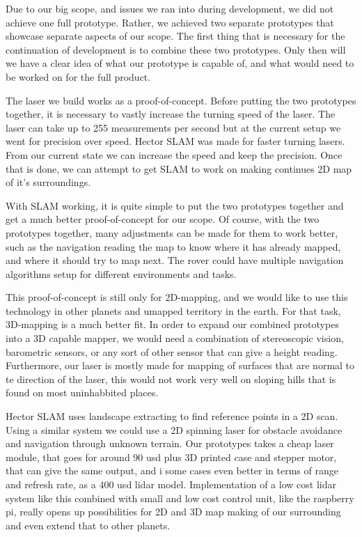 Due to our big scope, and issues we ran into during development, we did not achieve one full prototype. Rather, we achieved two separate prototypes that showcase separate aspects of our scope. The first thing that is necessary for the continuation of development is to combine these two prototypes. Only then will we have a clear idea of what our prototype is capable of, and what would need to be worked on for the full product.

The laser we build works as a proof-of-concept. Before putting the two prototypes together, it is necessary to vastly increase the turning speed of the laser. The laser can take up to 255 measurements per second but at the current setup we went for precision over speed. Hector SLAM was made for faster turning lasers. From our current state we can increase the speed and keep the precision. Once that is done, we can attempt to get SLAM to work on making continues 2D map of it's surroundings.

With SLAM working, it is quite simple to put the two prototypes together and get a much better proof-of-concept for our scope. Of course, with the two prototypes together, many adjustments can be made for them to work better, such as the navigation reading the map to know where it has already mapped, and where it should try to map next. The rover could have multiple navigation algorithms setup for different environments and tasks. 

This proof-of-concept is still only for 2D-mapping, and we would like to use this technology in other planets and umapped territory in the earth. For that task, 3D-mapping is a much better fit. In order to expand our combined prototypes into a 3D capable mapper, we would need a combination of stereoscopic vision, barometric sensors, or any sort of other sensor that can give a height reading. Furthermore, our laser is mostly made for mapping of surfaces that are normal to te direction of the laser, this would not work very well on sloping hills that is found on most uninhabbited places.

Hector SLAM uses landscape extracting to find reference points in a 2D scan. Using a similar system we could use a 2D spinning laser for obstacle avoidance and navigation through unknown terrain. Our prototypes takes a cheap laser module, that goes for around 90 usd plus 3D printed case and stepper motor, that can give the same output, and i some cases even better in terms of range and refresh rate, as a 400 usd lidar model. Implementation of a low cost lidar system like this combined with small and low cost control unit, like the raspberry pi, really opens up possibilities for 2D and 3D map making of our surrounding and even extend that to other planets. 





